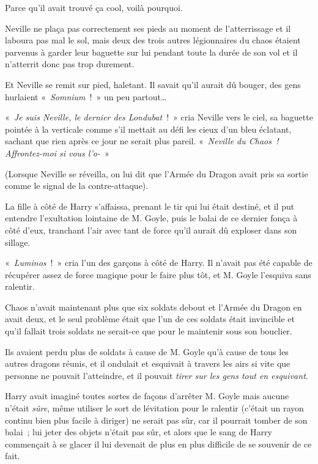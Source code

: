{Parce qu'il avait trouvé ça cool, voilà pourquoi.

Neville ne plaça pas correctement ses pieds au moment de l'atterrissage et il laboura pas mal le sol, mais deux des trois autres légionnaires du chaos étaient parvenus à garder leur baguette sur lui pendant toute la durée de son vol et il n'atterrit donc pas trop durement.

Et Neville se remit sur pied, haletant.
Il savait qu'il aurait dû bouger, des gens hurlaient «~\emph{Somnium}~!~»
un peu partout…

«~\emph{Je suis Neville, le dernier des Londubat}~!~»
cria Neville vers le ciel, sa baguette pointée à la verticale comme s'il mettait au défi les cieux d'un bleu éclatant, sachant que rien après ce jour ne serait plus pareil.
«~\emph{Neville du Chaos~!
Affrontez-moi si vous l'o-}~»

(Lorsque Neville se réveilla, on lui dit que l'Armée du Dragon avait pris sa sortie comme le signal de la contre-attaque).

\later

La fille à côté de Harry s'affaissa, prenant le tir qui lui était destiné, et il put entendre l'exultation lointaine de M. Goyle, puis le balai de ce dernier fonça à côté d'eux, tranchant l'air avec tant de force qu'il aurait dû exploser dans son sillage.

«~\emph{Luminos}~!~»
cria l'un des garçons à côté de Harry.
Il n'avait pas été capable de récupérer assez de force magique pour le faire plus tôt, et M. Goyle l'esquiva sans ralentir.

Chaos n'avait maintenant plus que six soldats debout et l'Armée du Dragon en avait deux, et le seul problème était que l'un de ces soldats était invincible et qu'il fallait trois soldats ne serait-ce que pour le maintenir sous son bouclier.

Ils avaient perdu plus de soldats à cause de M. Goyle qu'à cause de tous les autres dragons réunis, et il ondulait et esquivait à travers les airs si vite que personne ne pouvait l'atteindre, et il pouvait \emph{tirer sur les gens tout en esquivant}.

Harry avait imaginé toutes sortes de façons d'arrêter M. Goyle mais aucune n'était \emph{sûre}, même utiliser le sort de lévitation pour le ralentir (c'était un rayon continu bien plus facile à diriger) ne serait pas sûr, car il pourrait tomber de son balai~; lui jeter des objets n'était pas sûr, et alors que le sang de Harry commençait à se glacer il lui devenait de plus en plus difficile de se souvenir de ce fait.

}
